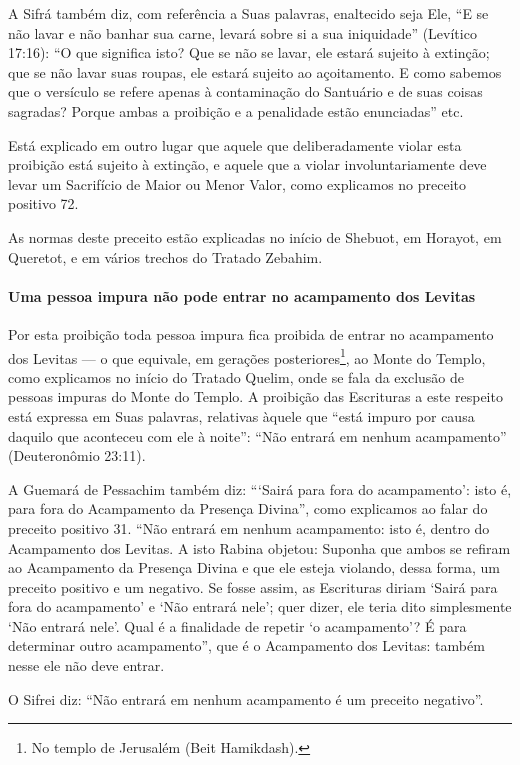A Sifrá também diz, com referência a Suas palavras, enaltecido seja Ele,
``E se não lavar e não banhar sua carne, levará sobre si a sua
iniquidade'' (Levítico 17:16): ``O que significa isto? Que se não se
lavar, ele estará sujeito à extinção; que se não lavar suas roupas, ele
estará sujeito ao açoitamento. E como sabemos que o versículo se refere
apenas à contaminação do Santuário e de suas coisas sagradas? Porque
ambas a proibição e a penalidade estão enunciadas'' etc.

Está explicado em outro lugar que aquele que deliberadamente violar
esta proibição está sujeito à extinção, e aquele que a violar
involuntariamente deve levar um Sacrifício de Maior ou Menor Valor,
como explicamos no preceito positivo 72.

As normas deste preceito estão explicadas no início de Shebuot, em
Horayot, em Queretot, e em vários trechos do Tratado Zebahim.

\paragraph{Uma pessoa impura não pode entrar no acampamento dos Levitas}

Por esta proibição toda pessoa impura fica proibida de entrar no
acampamento dos Levitas --- o que equivale, em gerações
posteriores\footnote{No templo de Jerusalém (Beit Hamikdash).}, ao Monte do Templo, como explicamos
no início do Tratado Quelim, onde se fala da exclusão de pessoas
impuras do Monte do Templo. A proibição das Escrituras a este respeito
está expressa em Suas palavras, relativas àquele que ``está impuro por
causa daquilo que aconteceu com ele à noite'': ``Não entrará em nenhum
acampamento'' (Deuteronômio 23:11).

A Guemará de Pessachim também diz: ```Sairá para fora do acampamento':
isto é, para fora do Acampamento da Presença Divina'', como explicamos
ao falar do preceito positivo 31. ``Não entrará em nenhum acampamento:
isto é, dentro do Acampamento dos Levitas. A isto Rabina objetou:
Suponha que ambos se refiram ao Acampamento da Presença Divina e que
ele esteja violando, dessa forma, um preceito positivo e um negativo. Se
fosse assim, as Escrituras diriam `Sairá para fora do acampamento' e
`Não entrará nele'; quer dizer, ele teria dito simplesmente `Não entrará
nele'. Qual é a finalidade de repetir `o acampamento'? É para
determinar outro acampamento'', que é o Acampamento dos Levitas: também
nesse ele não deve entrar.

O Sifrei diz: ``Não entrará em nenhum acampamento é um preceito
negativo''.

